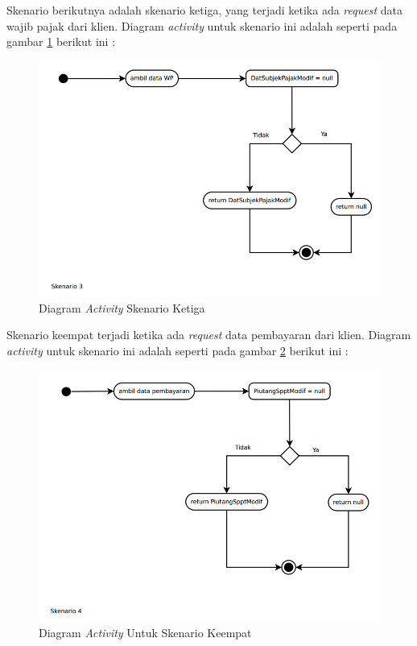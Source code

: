 Skenario berikutnya adalah skenario ketiga, yang terjadi ketika ada \textit{request} data wajib pajak dari klien. Diagram \textit{activity} untuk skenario ini adalah seperti pada gambar \ref{fig:act-dia-3} berikut ini :

\begin{figure}[H]
	\centering
	\includegraphics[width=1\textwidth]{./resources/uml/activity-dia-3}
	\caption{Diagram \textit{Activity} Skenario Ketiga}
	\label{fig:act-dia-3}
\end{figure}

Skenario keempat terjadi ketika ada \textit{request} data pembayaran dari klien. Diagram \textit{activity} untuk skenario ini adalah seperti pada gambar \ref{fig:act-dia-4} berikut ini :

\begin{figure}[H]
	\centering
	\includegraphics[width=1\textwidth]{./resources/uml/activity-dia-4}
	\caption{Diagram \textit{Activity} Untuk Skenario Keempat}
	\label{fig:act-dia-4}
\end{figure}

